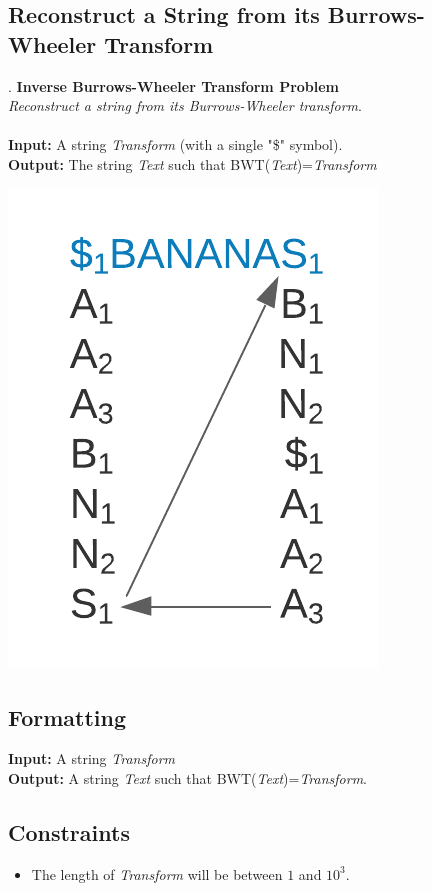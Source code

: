 \documentclass{article}
\begin{document}
\subsection{Reconstruct a String from its Burrows-Wheeler Transform}.
\hline\vspace{5}
\noindent\textbf{Inverse Burrows-Wheeler Transform Problem}\\
\emph{Reconstruct a string from its Burrows-Wheeler transform}.\\ \\
\textbf{Input:} A string \emph{Transform} (with a single "\$" symbol). \\
\textbf{Output:} The string \emph{Text} such that BWT(\emph{Text})=\emph{Transform}
\begin{center}
    \includegraphics[scale=0.2]{logos/9J.png} 
\end{center}
\hline\vspace{5}

\subsection*{Formatting}
\noindent\textbf{Input:} A string \emph{Transform}\\
\noindent\textbf{Output:} A string \emph{Text} such that BWT(\emph{Text})=\emph{Transform}.

\subsection*{Constraints}
\begin{itemize}
    \item The length of \emph{Transform} will be between $1$ and $10^3$.
\end{itemize}
\pagebreak
\end{document}
